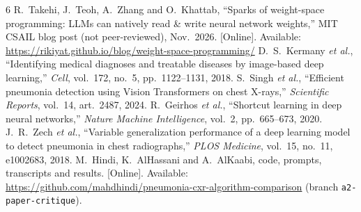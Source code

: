 \begin{thebibliography}{6}
\footnotesize
{} R.~Takehi, J.~Teoh, A.~Zhang and O.~Khattab, ``Sparks of weight-space programming: LLMs can natively read \& write neural network weights,'' MIT CSAIL blog post (not peer-reviewed), Nov.~2026. [Online]. Available: \url{https://rikiyat.github.io/blog/weight-space-programming/}
 D.~S.~Kermany \emph{et al.}, ``Identifying medical diagnoses and treatable diseases by image-based deep learning,'' \emph{Cell}, vol.~172, no.~5, pp.~1122--1131, 2018.
 S.~Singh \emph{et al.}, ``Efficient pneumonia detection using Vision Transformers on chest X-rays,'' \emph{Scientific Reports}, vol.~14, art.~2487, 2024.
 R.~Geirhos \emph{et al.}, ``Shortcut learning in deep neural networks,'' \emph{Nature Machine Intelligence}, vol.~2, pp.~665--673, 2020.
 J.~R.~Zech \emph{et al.}, ``Variable generalization performance of a deep learning model to detect pneumonia in chest radiographs,'' \emph{PLOS Medicine}, vol.~15, no.~11, e1002683, 2018.
 M.~Hindi, K.~AlHassani and A.~AlKaabi, code, prompts, transcripts and results. [Online]. Available: \url{https://github.com/mahdhindi/pneumonia-cxr-algorithm-comparison} (branch \texttt{a2-paper-critique}).
\end{thebibliography}
